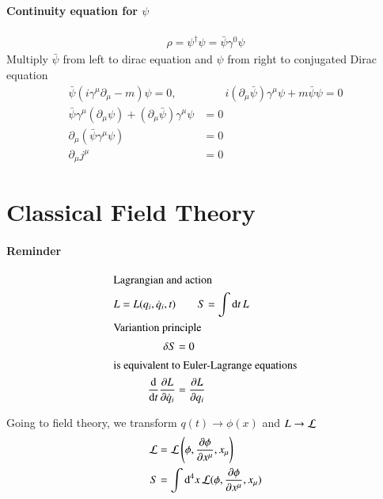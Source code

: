 \paragraph{Continuity equation for $\psi$}
\begin{align}
   \rho = \psi^\dagger \psi = \bar{\psi} \gamma^0 \psi
\end{align}
Multiply $\bar{\psi}$ from left to dirac equation and $\psi$ from right to conjugated Dirac equation
\begin{align*}
   \bar{\psi} \left( i \gamma^\mu \partial_\mu - m \right) \psi = 0, &\qquad i (\partial_\mu \bar{\psi}) \gamma^\mu \psi + m \bar{\psi} \psi = 0\\
   \bar\psi \gamma^\mu (\partial_\mu \psi) + (\partial_\mu \bar\psi) \gamma^\mu \psi &= 0 \\
   \partial_\mu ( \bar{\psi} \gamma^\mu \psi) &= 0 \\
   \partial_\mu j^\mu &= 0
\end{align*}

\section{Classical Field Theory} 
\paragraph{Reminder} 
\begin{align*}
   \shortintertext{Lagrangian and action}
   L = L (q_i, \dot{q}_i, t) &\qquad   S = \int \dd{t} L \\
   \shortintertext{Variantion principle}
   \delta S &= 0 \\
   \shortintertext{is equivalent to Euler-Lagrange equations}
   \frac{\dd}{\dd{t}} \frac{\partial L}{ \partial \dot{q}_i}& =\frac{\partial L}{\partial q_i}
\end{align*} 

Going to field theory, we transform $q(t) \rightarrow \phi(x)$ and $L \rightarrow \mathcal{L}$
\begin{align*}
   \mathcal{L} &= \mathcal{L} \left(\phi, \frac{\partial \phi}{\partial x^\mu}, x_\mu \right) \\
   S &= \int \dd[4]{x} \mathcal{L}(\phi, \frac{\partial \phi}{\partial x^\mu}, x_\mu) 
\end{align*}

